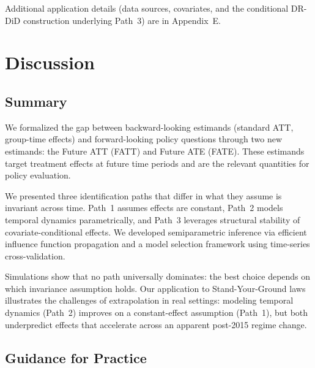\documentclass{article}
\begin{document}
Additional application details (data sources, covariates, and the conditional DR-DiD construction underlying Path~3) are in Appendix~E.


\section{Discussion}
\label{sec:discussion}


\subsection{Summary}


We formalized the gap between backward-looking estimands (standard ATT, group-time effects) and forward-looking policy questions through two new estimands: the Future ATT (FATT) and Future ATE (FATE). These estimands target treatment effects at future time periods and are the relevant quantities for policy evaluation.

We presented three identification paths that differ in what they assume is invariant across time. Path~1 assumes effects are constant, Path~2 models temporal dynamics parametrically, and Path~3 leverages structural stability of covariate-conditional effects. We developed semiparametric inference via efficient influence function propagation and a model selection framework using time-series cross-validation.

Simulations show that no path universally dominates: the best choice depends on which invariance assumption holds. Our application to Stand-Your-Ground laws illustrates the challenges of extrapolation in real settings: modeling temporal dynamics (Path~2) improves on a constant-effect assumption (Path~1), but both underpredict effects that accelerate across an apparent post-2015 regime change.

\subsection{Guidance for Practice}
\end{document}
